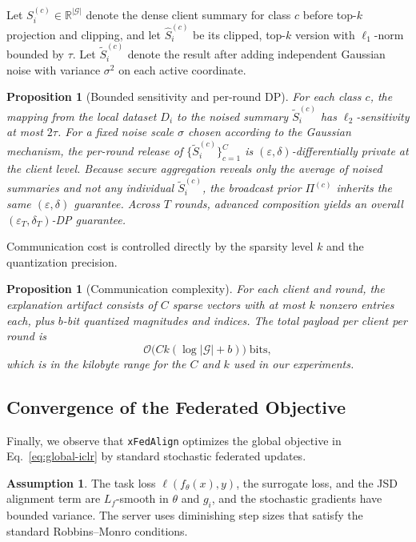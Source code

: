 \documentclass{article}
\theoremstyle{plain}
\newtheorem{proposition}[theorem]{Proposition}
\theoremstyle{definition}
\newtheorem{assumption}[theorem]{Assumption}
\theoremstyle{remark}
\begin{document}
Let $S_i^{(c)} \in \mathbb{R}^{|\mathcal{G}|}$ denote the dense client
summary for class $c$ before top-$k$ projection and clipping, and let
$\hat{S}_i^{(c)}$ be its clipped, top-$k$ version with
$\ell_1$-norm bounded by $\tau$. Let $\tilde{S}_i^{(c)}$ denote the result
after adding independent Gaussian noise with variance $\sigma^2$ on each
active coordinate.

\begin{proposition}[Bounded sensitivity and per-round DP]
\label{prop:dp}
For each class $c$, the mapping from the local dataset $D_i$ to the noised
summary $\tilde{S}_i^{(c)}$ has $\ell_2$-sensitivity at most $2\tau$. For a
fixed noise scale $\sigma$ chosen according to the Gaussian mechanism, the
per-round release of $\{\tilde{S}_i^{(c)}\}_{c=1}^C$ is
$(\varepsilon,\delta)$-differentially private at the client level. Because
secure aggregation reveals only the average of noised summaries and not any
individual $\tilde{S}_i^{(c)}$, the broadcast prior $\Pi^{(c)}$ inherits the
same $(\varepsilon,\delta)$ guarantee. Across $T$ rounds, advanced
composition yields an overall $(\varepsilon_T,\delta_T)$-DP guarantee.
\end{proposition}

Communication cost is controlled directly by the sparsity level $k$ and the
quantization precision.

\begin{proposition}[Communication complexity]
\label{prop:comm}
For each client and round, the explanation artifact consists of $C$ sparse
vectors with at most $k$ nonzero entries each, plus $b$-bit quantized
magnitudes and indices. The total payload per client per round is
\begin{equation}
\label{eq:comm-complexity}
\mathcal{O}\big(Ck(\log|\mathcal{G}| + b)\big) \;\text{bits},
\end{equation}
which is in the kilobyte range for the $C$ and $k$ used in our experiments.
\end{proposition}

\subsection{Convergence of the Federated Objective}

Finally, we observe that \texttt{xFedAlign} optimizes the global objective in
Eq.~\eqref{eq:global-iclr} by standard stochastic federated updates.

\begin{assumption}
\label{ass:fed-convergence}
The task loss $\ell(f_\theta(x),y)$, the surrogate loss, and the JSD alignment
term are $L_f$-smooth in $\theta$ and $g_i$, and the stochastic gradients have
bounded variance. The server uses diminishing step sizes that satisfy the
standard Robbins--Monro conditions.
\end{assumption}
\end{document}

